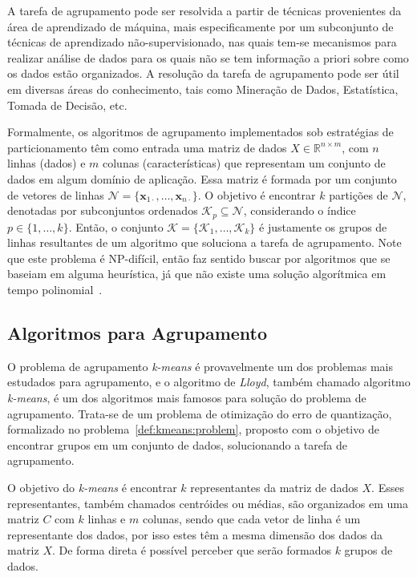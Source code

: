 \documentclass[
    12pt,                %
    oneside,            %
    a4paper,            %
    english,            %
    brazil                %
    ]{abntex2ppgsi}
\begin{document}
A tarefa de agrupamento pode ser resolvida a partir de técnicas provenientes da área de aprendizado de máquina, mais especificamente por um subconjunto de técnicas de aprendizado não-supervisionado, nas quais tem-se mecanismos para realizar análise de dados para os quais não se tem informação a priori sobre como os dados estão organizados.
A resolução da tarefa de agrupamento pode ser útil em diversas áreas do conhecimento, tais como Mineração de Dados, Estatística, Tomada de Decisão, etc.

Formalmente, os algoritmos de agrupamento implementados sob estratégias de particionamento têm como entrada uma matriz de dados $X \in \mathbb{R}^{n \times m}$, com $n$ linhas (dados) e $m$ colunas (características) que representam um conjunto de dados em algum domínio de aplicação.
Essa matriz é formada por um conjunto de vetores de linhas $\mathcal{N} = \{ \mathbf{x}_{1 \cdot}, \dots, \mathbf{x}_{n \cdot} \}$.
O objetivo é encontrar $k$ partições de $\mathcal{N}$, denotadas por subconjuntos ordenados $\mathcal{K}_p \subseteq \mathcal{N}$, considerando o índice $p \in \{ 1, \dots, k\}$.
Então, o conjunto $\mathscr{K} = \{\mathcal{K}_1, \dots, \mathcal{K}_k\}$ é justamente os grupos de linhas resultantes de um algoritmo que soluciona a tarefa de agrupamento.
Note que este problema é NP-difícil, então faz sentido buscar por algoritmos que se baseiam em alguma heurística, já que não existe uma solução algorítmica em tempo polinomial~\cite{Aloise2009}.

\subsection{Algoritmos para Agrupamento}
\label{sec:clustering:algos}

O problema de agrupamento \textit{k-means} é provavelmente um dos problemas mais estudados para agrupamento, e o algoritmo de \textit{Lloyd}, também chamado algoritmo \textit{k-means}, é um dos algoritmos mais famosos para solução do problema de agrupamento.
Trata-se de um problema de otimização do erro de quantização, formalizado no problema~\ref{def:kmeans:problem}, proposto com o objetivo de encontrar grupos em um conjunto de dados, solucionando a tarefa de agrupamento.

O objetivo do \textit{k-means} é encontrar $k$ representantes da matriz de dados $X$.
Esses representantes, também chamados centróides ou médias, são organizados em uma matriz $C$ com $k$ linhas e $m$ colunas, sendo que cada vetor de linha é um representante dos dados, por isso estes têm a mesma dimensão dos dados da matriz $X$.
De forma direta é possível perceber que serão formados $k$ grupos de dados.
\end{document}
